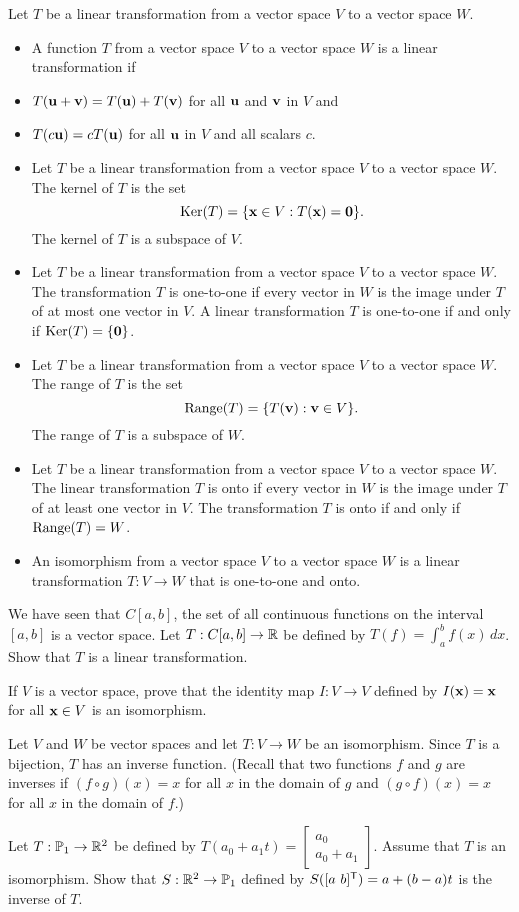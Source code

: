 Let $T$ be a linear transformation from a vector space $V$ to a vector space $W$. 
\begin{itemize}
\item A function $T$  from a vector space $V$ to a vector space $W$ is a linear transformation if 
	\be
	\item $T(\mathbf{u} + \mathbf{v}) = T(\mathbf{u}) + T(\mathbf{v})$ for all $\mathbf{u}$ and $\mathbf{v}$ in $V$ and
	\item $T(c\mathbf{u}) = cT(\mathbf{u})$ for all $\mathbf{u}$ in $V$ and all scalars $c$.
	\ee
\item Let $T$ be a linear transformation from a vector space $V$ to a vector space $W$. The kernel of $T$ is the set
\[\text{Ker}(T) = \{\mathbf{x} \in V : T(\mathbf{x}) = \mathbf{0}\}.\]
The kernel of $T$ is a subspace of $V$.
\item Let $T$ be a linear transformation from a vector space $V$ to a vector space $W$. The transformation $T$ is one-to-one if every vector in $W$ is the image under $T$ of at most one vector in $V$. A linear transformation $T$ is one-to-one if and only if $\text{Ker}(T) = \{\mathbf{0}\}$.
\item Let $T$ be a linear transformation from a vector space $V$ to a vector space $W$. The range of $T$ is the set 
\[\text{Range}(T) = \{T(\mathbf{v}) : \mathbf{v} \in V\}.\]
The range of $T$ is a subspace of $W$.
\item Let $T$ be a linear transformation from a vector space $V$ to a vector space $W$. The linear transformation $T$ is onto if every vector in $W$ is the image under $T$ of at least one vector in $V$. The transformation $T$ is onto if and only if $\text{Range}(T) = W$.
\item An isomorphism from a vector space $V$ to a vector space $W$ is a linear transformation $T : V \to W$ that is one-to-one and onto. 
\end{itemize}

\be

\item We have seen that $C[a,b]$, the set of all continuous functions on the interval $[a,b]$ is a vector space. Let $T : C[a,b] \to \mathbb{R}$ be defined by $T(f) = \int_a^b f(x) \, dx$. 
Show that $T$ is a linear transformation. 

\item \label{ex:8_a_reflexive_isomorphism}  If $V$ is a vector space, prove that the identity map $I:V \to V$ defined by $I(\mathbf{x}) = \mathbf{x}$ for all $\mathbf{x} \in V$ is an isomorphism.


\item \label{ex:8_a_inverse_isomorphism} Let $V$ and $W$ be vector spaces and let $T : V \to W$ be an isomorphism.  Since $T$ is a bijection, $T$ has an inverse function. (Recall that two functions $f$ and $g$ are inverses if $(f \circ g)(x) = x$ for all $x$ in the domain of $g$ and $(g \circ f)(x) = x$ for all $x$ in the domain of $f$.)
\ba
\item Let $T: \mathbb{P}_1 \to \mathbb{R}^2$ be defined by $T(a_0+a_1t) = \left[ \begin{array}{c} a_0\\a_0+a_1 \end{array} \right]$. Assume that $T$ is an isomorphism. Show that $S: \mathbb{R}^2 \to \mathbb{P}_1$ defined by $S([a \ b]^{\mathsf{T}}) = a + (b-a)t$ is the inverse of $T$. 


